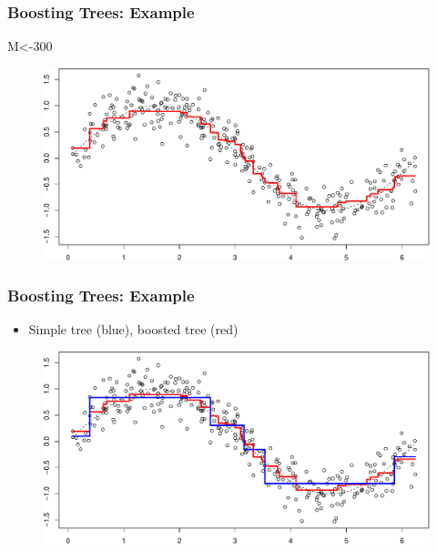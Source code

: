 \documentclass[
  shownotes,
  xcolor={svgnames},
  hyperref={colorlinks,citecolor=DarkBlue,linkcolor=DarkRed,urlcolor=DarkBlue}
  , aspectratio=169]{beamer}
\newenvironment{Shaded}{\begin{snugshade}}{\end{snugshade}}
\newcommand{\DecValTok}[1]{\textcolor[rgb]{0.00,0.00,0.81}{#1}}
\newcommand{\NormalTok}[1]{#1}
\begin{document}
\begin{frame}
\frametitle{Boosting Trees: Example}

\begin{Shaded}
\begin{Highlighting}[]
\NormalTok{M\textless{}{-}}\DecValTok{300}

\end{Highlighting}
\end{Shaded}

\begin{figure}[H] \centering
            \captionsetup{justification=centering}
              \includegraphics[scale=0.5]{figures/unnamed-chunk-8-1.pdf}
 \end{figure}

 \end{frame}
\begin{frame}
\frametitle{Boosting Trees: Example}

\begin{itemize}
\item Simple tree (blue), boosted tree (red)
\end{itemize}

\begin{figure}[H] \centering
            \captionsetup{justification=centering}
              \includegraphics[scale=0.5]{figures/unnamed-chunk-9-1.pdf}
 \end{figure}

 \end{frame}
\end{document}
